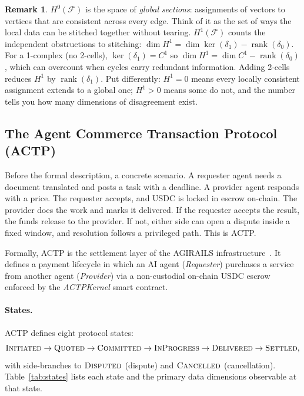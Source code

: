 \documentclass[11pt]{article}
\theoremstyle{plain}
\theoremstyle{definition}
\newtheorem{remark}[theorem]{Remark}
\newcommand{\Fsh}{\mathcal{F}}         %
\newcommand{\Cone}{C^{1}}
\newcommand{\Hzero}{H^{0}}
\newcommand{\Hone}{H^{1}}
\newcommand{\deltazero}{\delta_{0}}
\newcommand{\deltaone}{\delta_{1}}
\newcommand{\rank}{\operatorname{rank}}
\newcommand{\dimn}{\operatorname{dim}}
\newcommand{\sINIT}{\textsc{Initiated}}
\newcommand{\sQUOT}{\textsc{Quoted}}
\newcommand{\sCOMM}{\textsc{Committed}}
\newcommand{\sINPROG}{\textsc{InProgress}}
\newcommand{\sDELIV}{\textsc{Delivered}}
\newcommand{\sSETTL}{\textsc{Settled}}
\newcommand{\sDISP}{\textsc{Disputed}}
\newcommand{\sCANC}{\textsc{Cancelled}}
\begin{document}
\begin{remark}
$\Hzero(\Fsh)$ is the space of \emph{global sections}: assignments of
vectors to vertices that are consistent across every edge.  Think of it as
the set of ways the local data can be stitched together without tearing.
$\Hone(\Fsh)$ counts the independent obstructions to stitching:
$\dimn \Hone = \dimn \ker(\deltaone) - \rank(\deltazero)$.  For a 1-complex
(no 2-cells), $\ker(\deltaone) = \Cone$ so
$\dimn \Hone = \dimn \Cone - \rank(\deltazero)$, which can overcount when
cycles carry redundant information.  Adding 2-cells reduces $\Hone$ by
$\rank(\deltaone)$.  Put differently: $\Hone = 0$ means every locally
consistent assignment extends to a global one; $\Hone > 0$ means some do
not, and the number tells you how many dimensions of disagreement exist.
\end{remark}

\subsection{The Agent Commerce Transaction Protocol (ACTP)}
\label{sec:actp}

Before the formal description, a concrete scenario.  A requester agent needs
a document translated and posts a task with a deadline.  A provider agent
responds with a price.  The requester accepts, and USDC is locked in escrow
on-chain.  The provider does the work and marks it delivered.  If the
requester accepts the result, the funds release to the provider.  If not,
either side can open a dispute inside a fixed window, and resolution follows
a privileged path. This is ACTP.

Formally, ACTP is the settlement layer of the AGIRAILS
infrastructure~\cite{AGIRAILSsdk}.  It defines a payment lifecycle in which an
AI agent (\emph{Requester}) purchases a service from another agent
(\emph{Provider}) via a non-custodial on-chain USDC escrow enforced by the
\emph{ACTPKernel} smart contract.

\paragraph{States.}
ACTP defines eight protocol states:
\[
  \sINIT \to \sQUOT \to \sCOMM \to \sINPROG \to \sDELIV \to \sSETTL,
\]
with side-branches to $\sDISP$ (dispute) and $\sCANC$ (cancellation).
Table~\ref{tab:states} lists each state and the primary data dimensions
observable at that state.
\end{document}

